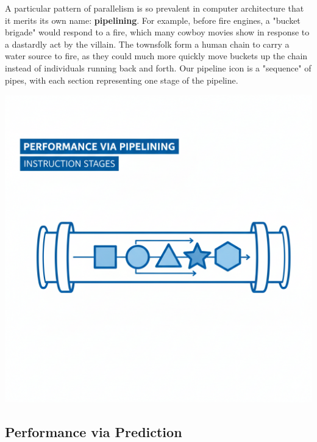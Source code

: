 \documentclass[a4paper,10pt]{article}
\begin{document}
\begin{minipage}[t]{0.7\linewidth}
A particular pattern of parallelism is so prevalent in computer architecture that it merits its own name: \textbf{pipelining}. For example, before fire engines, a "bucket brigade" would respond to a fire, which many cowboy movies show in response to a dastardly act by the villain. The townsfolk form a human chain to carry a water source to fire, as they could much more quickly move buckets up the chain instead of individuals running back and forth. Our pipeline icon is a "sequence" of pipes, with each section representing one stage of the pipeline.
\end{minipage}
\hfill
\begin{minipage}[t]{0.28\linewidth}
    \centering
    \includegraphics[width=\linewidth]{resources/8_great_ideas_of_computer_architecture/perf_via_pipelining.png}
\end{minipage}

\bigskip

\subsection{Performance via Prediction}
\end{document}
